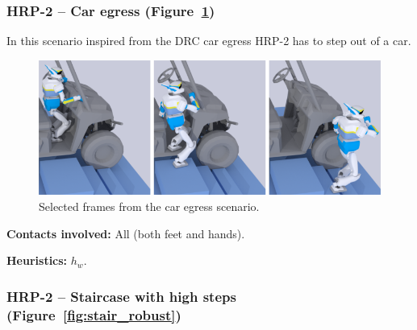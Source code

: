 \documentclass[journal]{IEEEtran}
\newcommand{\glslink}[2]{{#2}}
\begin{document}
\subsubsection{HRP-2 -- Car egress (Figure~\ref{fig:car})}
In this scenario inspired from the DRC car egress HRP-2 has to step out of a car.

\begin{figure}
  \centering
  \includegraphics[width=1\linewidth]{figures/polaris}
  \caption{
           Selected frames from the car egress scenario. }
		   \label{fig:car}
\end{figure}


\noindent\textbf{Contacts involved:} All (both feet and hands).

\noindent\textbf{Heuristics:} $h_w$.


\subsubsection{HRP-2 -- Staircase with high steps (Figure~\ref{fig:stair_robust})}
\newcommand{\widthValue}{0.13\linewidth}
\end{document}
